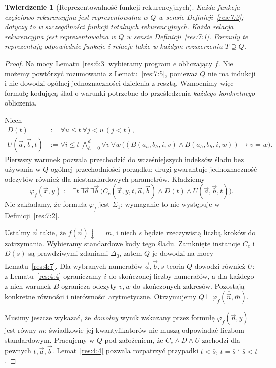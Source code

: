 \documentclass[11pt,a4paper]{article}
\numberwithin{equation}{section}
\theoremstyle{plain}
\newtheorem{twierdzenie}{Twierdzenie}[section]
\theoremstyle{definition}
\theoremstyle{remark}
\begin{document}
\begin{twierdzenie}[Reprezentowalność funkcji rekurencyjnych]\label{res:7:6}
Każda funkcja częściowo rekurencyjna jest reprezentowalna w $Q$ w sensie Definicji~\ref{res:7:2}; dotyczy to w szczególności funkcji totalnych rekurencyjnych. Każda relacja rekurencyjna jest reprezentowalna w $Q$ w sensie Definicji~\ref{res:7:1}. Formuły te reprezentują odpowiednie funkcje i relacje także w każdym rozszerzeniu $T\supseteq Q$.
\end{twierdzenie}
\begin{proof}
Na mocy Lematu~\ref{res:6:3} wybieramy program $e$ obliczający $f$. Nie możemy powtórzyć rozumowania z Lematu~\ref{res:7:5}, ponieważ $Q$ nie ma indukcji i nie dowodzi ogólnej jednoznaczności dzielenia z resztą. Wzmocnimy więc formułę kodującą ślad o warunki potrzebne do prześledzenia \emph{każdego konkretnego} obliczenia.

Niech
\begin{align*}
D(t)&:=\forall u\le t\ \forall j<u\,(j<t),\\
U(\vec a,\vec b,t)&:=\forall i\le t\ \bigwedge_{h=0}^d\forall v\,\forall w\,
\bigl((B(a_h,b_h,i,v)\land B(a_h,b_h,i,w))\to v=w\bigr).
\end{align*}
Pierwszy warunek pozwala przechodzić do wcześniejszych indeksów śladu bez używania w $Q$ ogólnej przechodniości porządku; drugi gwarantuje jednoznaczność odczytów również dla niestandardowych parametrów. Kładziemy
\[
\varphi_f(\vec x,y):=\exists t\,\exists\vec a\,\exists\vec b\,
\bigl(C_e(\vec x,y,t,\vec a,\vec b)\land D(t)\land U(\vec a,\vec b,t)\bigr).
\]
Nie zakładamy, że formuła $\varphi_f$ jest $\Sigma_1$; wymaganie to nie występuje w Definicji~\ref{res:7:2}.

Ustalmy $\vec n$ takie, że $f(\vec n)\downarrow=m$, i niech $s$ będzie rzeczywistą liczbą kroków do zatrzymania. Wybieramy standardowe kody tego śladu. Zamknięte instancje $C_e$ i $D(\overline s)$ są prawdziwymi zdaniami $\Delta_0$, zatem $Q$ je dowodzi na mocy Lematu~\ref{res:4:7}. Dla wybranych numerałów $\overline{\vec a},\overline{\vec b},\overline s$ teoria $Q$ dowodzi również $U$: z Lematu~\ref{res:4:4} ograniczamy $i$ do skończonej liczby numerałów, a dla każdego z nich warunek $B$ ogranicza odczyty $v,w$ do skończonych zakresów. Pozostają konkretne równości i nierówności arytmetyczne. Otrzymujemy
$Q\vdash\varphi_f(\overline{\vec n},\overline m)$.

Musimy jeszcze wykazać, że \emph{dowolny} wynik wskazany przez formułę $\varphi_f(\overline{\vec n},y)$ jest równy $\overline m$; świadkowie jej kwantyfikatorów nie muszą odpowiadać liczbom standardowym. Pracujemy w $Q$ pod założeniem, że $C_e\land D\land U$ zachodzi dla pewnych $t,\vec a,\vec b$. Lemat~\ref{res:4:4} pozwala rozpatrzyć przypadki $t<\overline s$, $t=\overline s$ i $\overline s<t$.


\end{proof}
\end{document}
